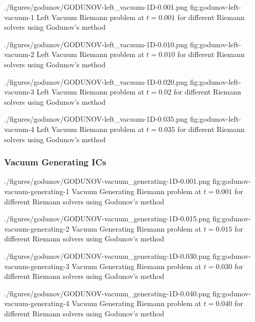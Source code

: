 \quickfigcap
	{./figures/godunov/GODUNOV-left_vacuum-1D-0.001.png}
	{fig:godunov-left-vacuum-1}
	{
		Left Vacuum Riemann problem at $t = 0.001$ for different Riemann solvers using Godunov's method
	}
	
\quickfigcap
	{./figures/godunov/GODUNOV-left_vacuum-1D-0.010.png}
	{fig:godunov-left-vacuum-2}
	{
		Left Vacuum Riemann problem at $t = 0.010$ for different Riemann solvers using Godunov's method
	}

\quickfigcap
	{./figures/godunov/GODUNOV-left_vacuum-1D-0.020.png}
	{fig:godunov-left-vacuum-3}
	{
		Left Vacuum Riemann problem at $t = 0.02$ for different Riemann solvers using Godunov's method
	}

\quickfigcap
	{./figures/godunov/GODUNOV-left_vacuum-1D-0.035.png}
	{fig:godunov-left-vacuum-4}
	{
		Left Vacuum Riemann problem at $t = 0.035$ for different Riemann solvers using Godunov's method
	}







\subsubsection{Vacuum Generating ICs}



\quickfigcap
	{./figures/godunov/GODUNOV-vacuum_generating-1D-0.001.png}
	{fig:godunov-vacuum-generating-1}
	{
		Vacuum Generating Riemann problem at $t = 0.001$ for different Riemann solvers using Godunov's method
	}
	


\quickfigcap
	{./figures/godunov/GODUNOV-vacuum_generating-1D-0.015.png}
	{fig:godunov-vacuum-generating-2}
	{
		Vacuum Generating Riemann problem at $t = 0.015$ for different Riemann solvers using Godunov's method
	}
	


\quickfigcap
	{./figures/godunov/GODUNOV-vacuum_generating-1D-0.030.png}
	{fig:godunov-vacuum-generating-3}
	{
		Vacuum Generating Riemann problem at $t = 0.030$ for different Riemann solvers using Godunov's method
	}
	

\quickfigcap
	{./figures/godunov/GODUNOV-vacuum_generating-1D-0.040.png}
	{fig:godunov-vacuum-generating-4}
	{
		Vacuum Generating Riemann problem at $t = 0.040$ for different Riemann solvers using Godunov's method
	}
	















